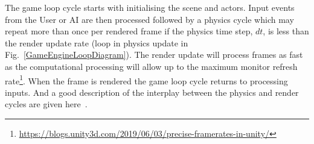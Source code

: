 \documentclass[letterpaper, 10 pt, journal, twoside]{IEEEtran}
\begin{document}
%

The game loop cycle starts with initialising the scene and actors. Input events from the User or AI are then processed followed by a physics cycle which may repeat more than once per rendered frame if the physics time step, $dt$, is less than the render update rate (loop in physics update in Fig.~\ref{GameEngineLoopDiagram}). The render update will process frames as fast as the computational processing will allow up to the maximum monitor refresh rate\footnote{\url{https://blogs.unity3d.com/2019/06/03/precise-framerates-in-unity/}}. When the frame is rendered the game loop cycle returns to processing inputs. And a good description of the interplay between the physics and render cycles are given here~\cite{JohnAustinUnity}.

%
\end{document}
